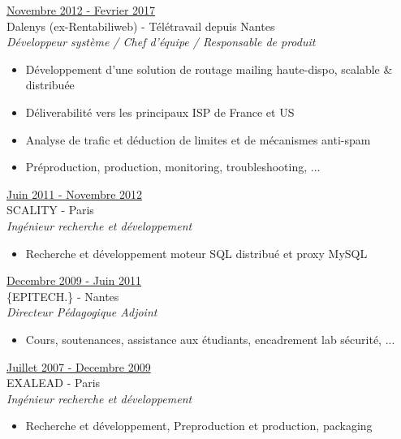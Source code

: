\documentclass[a4paper,10pt]{letter}
\begin{document}
\begin{description}
\item{\underline{Novembre 2012 - Fevrier 2017}}\\
  Dalenys (ex-Rentabiliweb) - T\'el\'etravail depuis Nantes\\
  \textit{D\'eveloppeur syst\`eme / Chef d'\'equipe / Responsable de produit}
  \begin{itemize}
  \item D\'eveloppement d'une solution de routage mailing haute-dispo, scalable \& distribu\'ee
  \item D\'eliverabilit\'e vers les principaux ISP de France et US
  \item Analyse de trafic et d\'eduction de limites et de m\'ecanismes anti-spam
  \item Pr\'eproduction, production, monitoring, troubleshooting, ...\\
  \end{itemize}

\item{\underline{Juin 2011 - Novembre 2012}}\\
  SCALITY - Paris\\
  \textit{Ing\'enieur recherche et d\'eveloppement}
  \begin{itemize}
  \item Recherche et d\'eveloppement moteur SQL distribu\'e et proxy MySQL\\
  \end{itemize}

\item{\underline{Decembre 2009 - Juin 2011}}\\
  \{EPITECH.\} - Nantes\\
  \textit{Directeur P\'edagogique Adjoint}
  \begin{itemize}
  \item Cours, soutenances, assistance aux \'etudiants, encadrement lab  s\'ecurit\'e, ...\\
  \end{itemize}

\item{\underline{Juillet 2007 - Decembre 2009}}\\
  EXALEAD - Paris\\
  \textit{Ing\'enieur recherche et d\'eveloppement}
  \begin{itemize}
  \item Recherche et d\'eveloppement, Preproduction et production, packaging\\
  \end{itemize}


\end{description}
\end{document}
